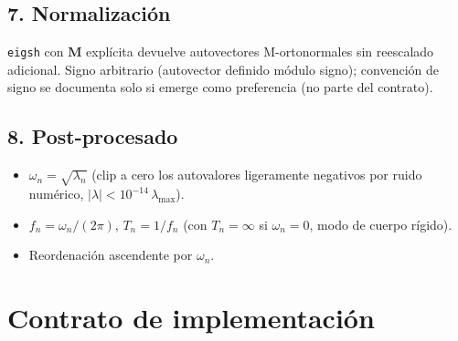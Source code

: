 \documentclass[11pt,letterpaper,oneside]{report}
\begin{document}
\subsection{7. Normalización}
\texttt{eigsh} con $\mathbf M$ explícita devuelve autovectores M-ortonormales sin reescalado adicional. Signo arbitrario (autovector definido módulo signo); convención de signo se documenta solo si emerge como preferencia (no parte del contrato).

\subsection{8. Post-procesado}
\begin{itemize}
  \item $\omega_n = \sqrt{\lambda_n}$ (clip a cero los autovalores ligeramente negativos por ruido numérico, $|\lambda| < 10^{-14}\,\lambda_\text{max}$).
  \item $f_n = \omega_n / (2\pi)$, $T_n = 1/f_n$ (con $T_n = \infty$ si $\omega_n = 0$, modo de cuerpo rígido).
  \item Reordenación ascendente por $\omega_n$.
\end{itemize}


\section{Contrato de implementación}
\end{document}
